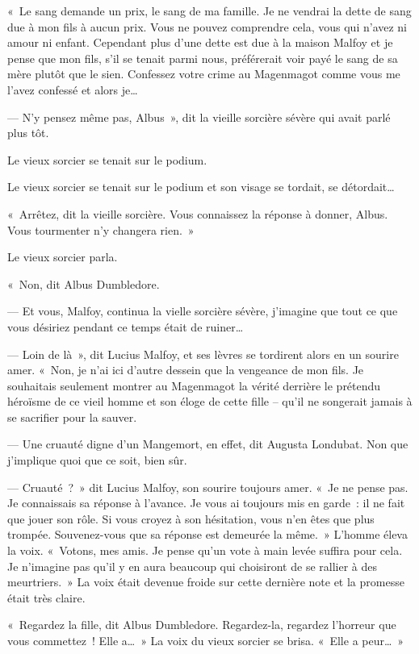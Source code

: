 «~Le sang demande un prix, le sang de ma famille. Je ne vendrai la dette de sang due à mon fils à aucun prix. Vous ne pouvez comprendre cela, vous qui n'avez ni amour ni enfant. Cependant plus d'une dette est due à la maison Malfoy et je pense que mon fils, s'il se tenait parmi nous, préférerait voir payé le sang de sa mère plutôt que le sien. Confessez votre crime au Magenmagot comme vous me l'avez confessé et alors je…

--- N'y pensez même pas, Albus~», dit la vieille sorcière sévère qui avait parlé plus tôt.

Le vieux sorcier se tenait sur le podium.

Le vieux sorcier se tenait sur le podium et son visage se tordait, se détordait…

«~Arrêtez, dit la vieille sorcière. Vous connaissez la réponse à donner, Albus. Vous tourmenter n'y changera rien.~»

Le vieux sorcier parla.

«~Non, dit Albus Dumbledore.

--- Et vous, Malfoy, continua la vielle sorcière sévère, j'imagine que tout ce que vous désiriez pendant ce temps était de ruiner…

--- Loin de là~», dit Lucius Malfoy, et ses lèvres se tordirent alors en un sourire amer. «~Non, je n'ai ici d'autre dessein que la vengeance de mon fils. Je souhaitais seulement montrer au Magenmagot la vérité derrière le prétendu héroïsme de ce vieil homme et son éloge de cette fille -- qu'il ne songerait jamais à se sacrifier pour la sauver.

--- Une cruauté digne d'un Mangemort, en effet, dit Augusta Londubat. Non que j'implique quoi que ce soit, bien sûr.

--- Cruauté~?~» dit Lucius Malfoy, son sourire toujours amer. «~Je ne pense pas. Je connaissais sa réponse à l'avance. Je vous ai toujours mis en garde~: il ne fait que jouer son rôle. Si vous croyez à son hésitation, vous n'en êtes que plus trompée. Souvenez-vous que sa réponse est demeurée la même.~» L'homme éleva la voix. «~Votons, mes amis. Je pense qu'un vote à main levée suffira pour cela. Je n'imagine pas qu'il y en aura beaucoup qui choisiront de se rallier à des meurtriers.~» La voix était devenue froide sur cette dernière note et la promesse était très claire.

«~Regardez la fille, dit Albus Dumbledore. Regardez-la, regardez l'horreur que vous commettez~! Elle a…~» La voix du vieux sorcier se brisa. «~Elle a peur…~»

